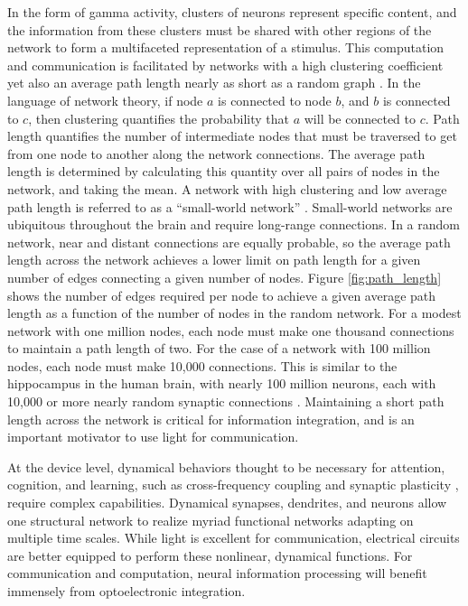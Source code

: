 \documentclass[twocolumn]{article}
\begin{document}
In the form of gamma activity, clusters of neurons represent specific content, and the information from these clusters must be shared with other regions of the network to form a multifaceted representation of a stimulus. This computation and communication is facilitated by networks with a high clustering coefficient yet also an average path length nearly as short as a random graph \cite{eskn2015}. In the language of network theory, if node $a$ is connected to node $b$, and $b$ is connected to $c$, then clustering quantifies the probability that $a$ will be connected to $c$. Path length quantifies the number of intermediate nodes that must be traversed to get from one node to another along the network connections. The average path length is determined by calculating this quantity over all pairs of nodes in the network, and taking the mean. A network with high clustering and low average path length is referred to as a ``small-world network'' \cite{wast1998}. Small-world networks are ubiquitous throughout the brain \cite{sp2010} and require long-range connections. In a random network, near and distant connections are equally probable, so the average path length across the network achieves a lower limit on path length for a given number of edges connecting a given number of nodes. Figure \ref{fig:path_length} shows the number of edges required per node to achieve a given average path length as a function of the number of nodes in the random network. For a modest network with one million nodes, each node must make one thousand connections to maintain a path length of two. For the case of a network with 100 million nodes, each node must make 10,000 connections. This is similar to the hippocampus in the human brain, with nearly 100 million neurons, each with 10,000 or more nearly random synaptic connections \cite{bu2006}. Maintaining a short path length across the network is critical for information integration, and is an important motivator to use light for communication.

At the device level, dynamical behaviors thought to be necessary for attention, cognition, and learning, such as cross-frequency coupling \cite{bu2006} and synaptic plasticity \cite{mage2012,ab2008,fudr2005}, require complex capabilities. Dynamical synapses, dendrites, and neurons allow one structural network to realize myriad functional networks adapting on multiple time scales. While light is excellent for communication, electrical circuits are better equipped to perform these nonlinear, dynamical functions. For communication and computation, neural information processing will benefit immensely from optoelectronic integration.
\end{document}

